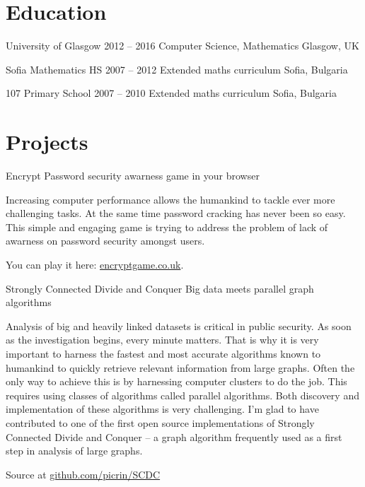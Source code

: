 \documentclass{tccv}
\begin{document}
\section{\LARGE Education \normalsize}

\begin{yearlist}

\item[University of Glasgow]
     {2012 -- 2016}
     {Computer Science, Mathematics}
     {Glasgow, UK}

\item[Sofia Mathematics HS]
     {2007 -- 2012}
     {Extended maths curriculum}
     {Sofia, Bulgaria}

\item[107 Primary School]
     {2007 -- 2010}
     {Extended maths curriculum}
     {Sofia, Bulgaria}
\end{yearlist}

\section{\LARGE Projects \normalsize}

\begin{eventlist}

\item{Encrypt}
     {Password security awarness game in your browser}
     {Increasing computer performance allows the humankind to tackle ever more challenging tasks. At the same time password cracking has never been so easy. This simple and engaging game is trying to address the problem of lack of awarness on password security amongst users. \par\medskip You can play it here: \href{encryptgame.co.uk}{encryptgame.co.uk}.
     }

\item{Strongly Connected Divide and Conquer}
   {Big data meets parallel graph algorithms}
   {Analysis of big and heavily linked datasets is critical in public security. As soon as the investigation begins, every minute matters. That is why it is very important to harness the fastest and most accurate algorithms known to humankind to quickly retrieve relevant information from large graphs. Often the only way to achieve this is by harnessing computer clusters to do the job. This requires using classes of algorithms called parallel algorithms. Both discovery and implementation of these algorithms is very challenging. I'm glad to have contributed to one of the first open source implementations of Strongly Connected Divide and Conquer -- a graph algorithm frequently used as a first step in analysis of large graphs. \par\medskip
   Source at 
   \href{http://github.com/picrin/SCDC}{github.com/picrin/SCDC}
   }

\end{eventlist}
\end{document}
